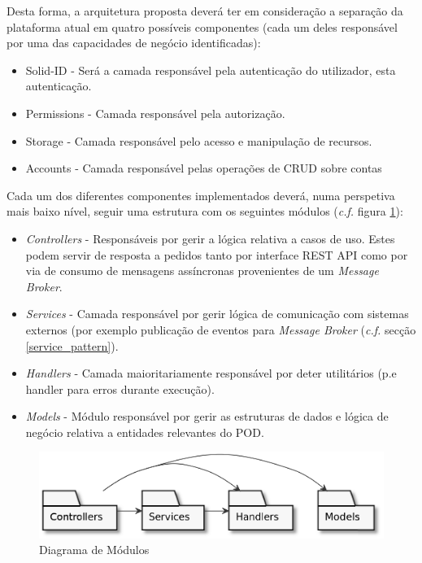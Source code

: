 Desta forma, a arquitetura proposta deverá ter em consideração a separação da plataforma atual em quatro possíveis componentes (cada um deles responsável por uma das capacidades de negócio identificadas):
\begin{itemize}
    \item Solid-ID - Será a camada responsável pela autenticação do utilizador, esta autenticação.
    \item Permissions - Camada responsável pela autorização.
    \item Storage - Camada responsável pelo acesso e manipulação de recursos.
    \item Accounts - Camada responsável pelas operações de CRUD sobre contas
\end{itemize}

Cada um dos diferentes componentes implementados deverá, numa perspetiva mais baixo nível, seguir uma estrutura com os seguintes módulos (\emph{c.f.} figura \ref{module_diagram}):

\begin{itemize}
    \item \emph{Controllers} - Responsáveis por gerir a lógica relativa a casos de uso. Estes podem servir de resposta a pedidos tanto por interface REST API como por via de consumo de mensagens assíncronas provenientes de um \emph{Message Broker}.
    \item \emph{Services} - Camada responsável por gerir lógica de comunicação com sistemas externos (por exemplo publicação de eventos para \emph{Message Broker} (\emph{c.f.} secção \ref{service_pattern}).
    \item \emph{Handlers} - Camada maioritariamente responsável por deter utilitários (p.e handler para erros durante execução).
    \item \emph{Models} - Módulo responsável por gerir as estruturas de dados e lógica de negócio relativa a entidades relevantes do POD.
    \end{itemize}

\begin{figure}[H]
    \begin{center}
    \includegraphics[width=0.6 \textwidth]{figures/module_diagram.eps}
    \caption{Diagrama de Módulos}
    \label{module_diagram}
    \end{center}
\end{figure} 


